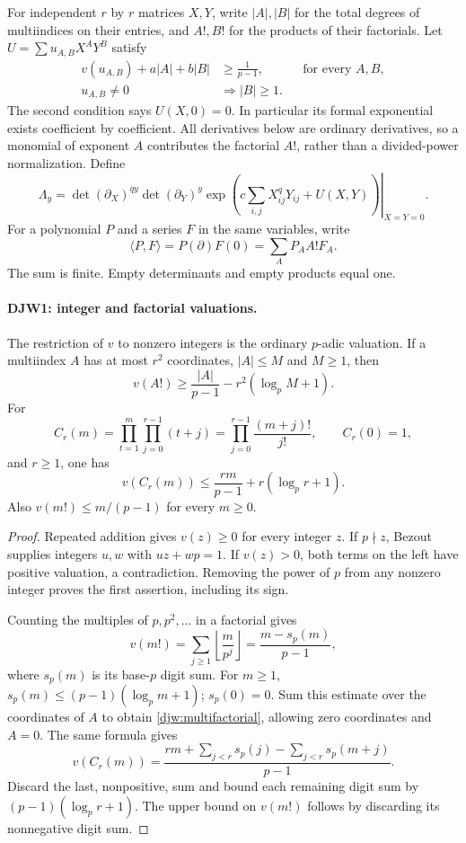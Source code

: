 For independent $r$ by $r$ matrices $X,Y$, write $|A|,|B|$ for
the total degrees of multiindices on their entries, and $A!,B!$ for
the products of their factorials.  Let
$U=\sum u_{A,B}X^AY^B$ satisfy
\begin{align}
 v(u_{A,B})+a|A|+b|B|&\ge\frac1{p-1},
       &&\text{for every }A,B,\label{djw:hm1}\\
 u_{A,B}\ne0&\Longrightarrow |B|\ge1.
       \label{djw:hm2}
\end{align}
The second condition says $U(X,0)=0$.  In particular its formal
exponential exists coefficient by coefficient.  All derivatives below
are ordinary derivatives, so a monomial of exponent $A$ contributes
the factorial $A!$, rather than a divided-power normalization.
Define
\begin{equation}
 \Lambda_y=
 \left.\det(\partial_X)^{qy}\det(\partial_Y)^y
 \exp\left(c\sum_{i,j}X_{ij}^{q}Y_{ij}+U(X,Y)\right)
 \right|_{X=Y=0}.
 \label{djw:lambda}
\end{equation}
For a polynomial $P$ and a series $F$ in the same variables, write
\[
 \langle P,F\rangle=P(\partial)F(0)
       =\sum_A P_A A!F_A.
\]
The sum is finite.  Empty determinants and empty products equal one.

\paragraph{DJW1: integer and factorial valuations.}
\label{claim:DJW1}
The restriction of $v$ to nonzero integers is the ordinary
$p$-adic valuation.  If a multiindex $A$ has at most $r^2$ coordinates,
$|A|\le M$ and $M\ge1$, then
\begin{equation}
 v(A!)\ge\frac{|A|}{p-1}-r^2(\log_p M+1).
 \label{djw:multifactorial}
\end{equation}
For
\[
 C_r(m)=\prod_{t=1}^{m}\prod_{j=0}^{r-1}(t+j)
       =\prod_{j=0}^{r-1}\frac{(m+j)!}{j!},\qquad C_r(0)=1,
\]
and $r\ge1$, one has
\begin{equation}
 v(C_r(m))\le\frac{rm}{p-1}+r(\log_p r+1).
 \label{djw:capacity}
\end{equation}
Also $v(m!)\le m/(p-1)$ for every $m\ge0$.

\begin{proof}
Repeated addition gives $v(z)\ge0$ for every integer $z$.
If $p\nmid z$, Bezout supplies integers $u,w$ with $uz+wp=1$.
If $v(z)>0$, both terms on the left have positive valuation, a
contradiction.  Removing the power of $p$ from any nonzero integer
proves the first assertion, including its sign.

Counting the multiples of $p,p^2,\ldots$ in a factorial gives
\[
 v(m!)=\sum_{j\ge1}\left\lfloor\frac m{p^j}\right\rfloor
       =\frac{m-s_p(m)}{p-1},
\]
where $s_p(m)$ is its base-$p$ digit sum.  For $m\ge1$,
$s_p(m)\le(p-1)(\log_p m+1)$; $s_p(0)=0$.
Sum this estimate over the coordinates of $A$ to obtain
\eqref{djw:multifactorial}, allowing zero coordinates and $A=0$.
The same formula gives
\[
 v(C_r(m))=
 \frac{rm+\sum_{j<r}s_p(j)-\sum_{j<r}s_p(m+j)}{p-1}.
\]
Discard the last, nonpositive, sum and bound each remaining digit
sum by $(p-1)(\log_p r+1)$.  The upper bound on $v(m!)$ follows
by discarding its nonnegative digit sum.
\end{proof}

